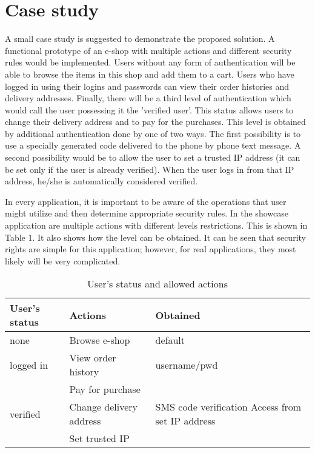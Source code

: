 \documentclass{sig-alternate}
\begin{document}
\section{Case study}
A small case study is suggested to demonstrate the proposed solution.  A functional prototype of an e-shop with multiple actions and different security rules would be implemented. Users without any form of authentication will be able to browse the items in this shop and add them to a cart. Users who have logged in using their logins and passwords can view their order histories and delivery addresses. Finally, there will be a third level of authentication which would call the user possessing it the 'verified user'. This status allows users to change their delivery address and to pay for the purchases. This level is obtained by additional authentication done by one of two ways. The first possibility is to use a specially generated code delivered to the phone by phone text message. A second possibility would be to allow the user to set a trusted IP address (it can be set only if the user is already verified). When the user logs in from that IP address, he/she is automatically considered verified.

In every application, it is important to be aware of the operations that user might utilize and then determine appropriate security rules. In the showcase application are multiple actions with different levels restrictions. This is shown in Table 1. It also shows how the level can be obtained. It can be seen that security rights are simple for this application; however, for real applications, they most likely will be very complicated.

\begin{table}
\vspace{0.5em}
\begin{tabular}{|m{1.9cm}|m{2.5cm}|m{3cm}|} \hline
User's status&Actions&Obtained\\ \hline
none & Browse e-shop & default\\ \hline
logged in & View order \newline history & username/pwd\\ \hline
 & Pay for purchase & \multirow{3}{*}{\parbox[t][][c]{3cm}{SMS code verification \newline Access from set IP address}} \\[5pt]
verified & Change delivery address &  \\[5pt] 
 & Set trusted IP & \\[5pt]
\hline\end{tabular}
\vspace{-0.8em}
\caption{User's status and allowed actions}
\vspace{-1em}
\end{table}
\end{document}
